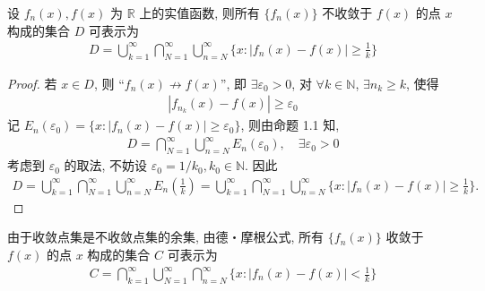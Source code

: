 \documentclass[../../main.tex]{subfiles}
\begin{document}
\begin{example}
设 $f_n(x), f(x)$ 为 $\mathbb{R}$ 上的实值函数, 则所有 $\{f_n(x)\}$ 不收敛于 $f(x)$ 的点 $x$ 构成的集合 $D$ 可表示为
\begin{align*}
D = \bigcup_{k = 1}^{\infty} \bigcap_{N = 1}^{\infty} \bigcup_{n = N}^{\infty} \{x : |f_n(x) - f(x)| \geqslant \frac{1}{k}\}
\end{align*}
\end{example}
\begin{proof}
若 $x \in D$, 则 “$f_n(x) \nrightarrow f(x)$”, 即 $\exists \varepsilon_0 > 0$, 对 $\forall k \in \mathbb{N}$, $\exists n_k \geqslant k$, 使得
\begin{align*}
|f_{n_k}(x) - f(x)| \geqslant \varepsilon_0
\end{align*}
记 $E_n(\varepsilon_0) = \{x : |f_n(x) - f(x)| \geqslant \varepsilon_0\}$, 则由命题 1.1 知,
\begin{align*}
D = \bigcap_{N = 1}^{\infty} \bigcup_{n = N}^{\infty} E_n(\varepsilon_0), \quad \exists \varepsilon_0 > 0
\end{align*}
考虑到 $\varepsilon_0$ 的取法, 不妨设 $\varepsilon_0 = 1/k_0, k_0 \in \mathbb{N}$. 因此
\begin{align*}
D = \bigcup_{k = 1}^{\infty} \bigcap_{N = 1}^{\infty} \bigcup_{n = N}^{\infty} E_n\left(\frac{1}{k}\right)
= \bigcup_{k = 1}^{\infty} \bigcap_{N = 1}^{\infty} \bigcup_{n = N}^{\infty} \{x : |f_n(x) - f(x)| \geqslant \frac{1}{k}\}.
\end{align*}
\end{proof}
\begin{remark}
由于收敛点集是不收敛点集的余集, 由德・摩根公式, 所有 $\{f_n(x)\}$ 收敛于 $f(x)$ 的点 $x$ 构成的集合 $C$ 可表示为
\begin{align*}
C = \bigcap_{k = 1}^{\infty} \bigcup_{N = 1}^{\infty} \bigcap_{n = N}^{\infty} \{x : |f_n(x) - f(x)| < \frac{1}{k}\}
\end{align*} 
\end{remark}
\end{document}
